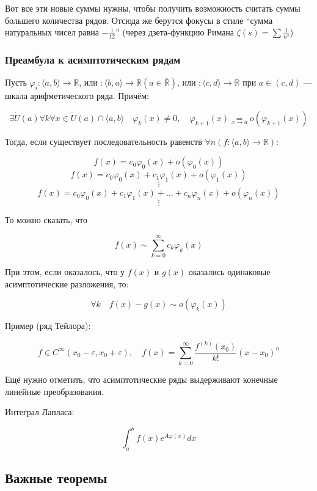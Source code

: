 \documentclass{article}
\begin{document}
Вот все эти новые суммы нужны, чтобы получить возможность считать суммы большего количества рядов. Отсюда же берутся фокусы в стиле ``сумма натуральных чисел равна $-\frac{1}{12}$'' (через дзета-функцию Римана $\zeta(s) = \sum \frac{1}{n^s}$)

\subsubsection{Преамбула к асимптотическим рядам}

Пусть $\varphi_i: \langle a, b \rangle \rightarrow \mathbb{R}$, или $: \langle b, a \rangle \rightarrow \mathbb{R} (a \in \overline{\mathbb{R}})$, или $: \langle c, d \rangle \rightarrow \mathbb{R}$ при $a \in (c, d)$ --- шкала арифметического ряда. Причём: 

\[\exists \dot{U}(a) \forall k \forall x \in \dot{U}(a) \cap \langle a, b \rangle \quad \varphi_{k}(x) \neq 0, \quad \varphi_{k + 1}(x) \underset{x \rightarrow a}{=} o(\varphi_{k + 1}(x))\]

Тогда, если существует последовательность равенств $\forall n (f: \langle a, b \rangle \rightarrow \mathbb{R})$:

\[f(x) = c_{0}\varphi_{0}(x) + o(\varphi_{0}(x))\]
\[f(x) = c_{0}\varphi_{0}(x) + c_{1}\varphi_{1}(x) + o(\varphi_{1}(x))\]
\[\vdots\]
\[f(x) = c_{0}\varphi_{0}(x) + c_{1}\varphi_{1}(x) + \ldots + c_{n}\varphi_n(x) + o(\varphi_{n}(x))\]
\[\vdots\]

То можно сказать, что 

\[f(x) \sim \sum_{k = 0}^{\infty} c_{k}\varphi_{k}(x)\]


При этом, если оказалось, что у $f(x)$ и $g(x)$ оказались одинаковые асимптотические разложения, то: 

\[\forall k \quad f(x) - g(x) \sim o(\varphi_k(x))\]

Пример (ряд Тейлора): 

\[f \in C^{\infty}(x_0 - \varepsilon, x_0 + \varepsilon), \quad f(x) = \sum_{k = 0}^{\infty} \frac{f^{(k)}(x_0)}{k!}(x - x_0)^{n}\]


Ещё нужно отметить, что асимптотические ряды выдерживают конечные линейные преобразования.

Интеграл Лапласа: 

\[\int_a^b f(x)e^{A\varphi(x)}dx\]

\newpage

\subsection{Важные теоремы}
\end{document}
